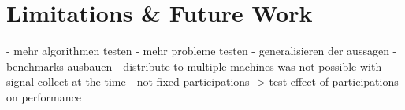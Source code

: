 \chapter{Limitations \& Future Work}
\label{c:limitations}

- mehr algorithmen testen
- mehr probleme testen
- generalisieren der aussagen
- benchmarks ausbauen
- distribute to multiple machines was not possible with signal collect at the time
- not fixed participations -> test effect of participations on performance

 